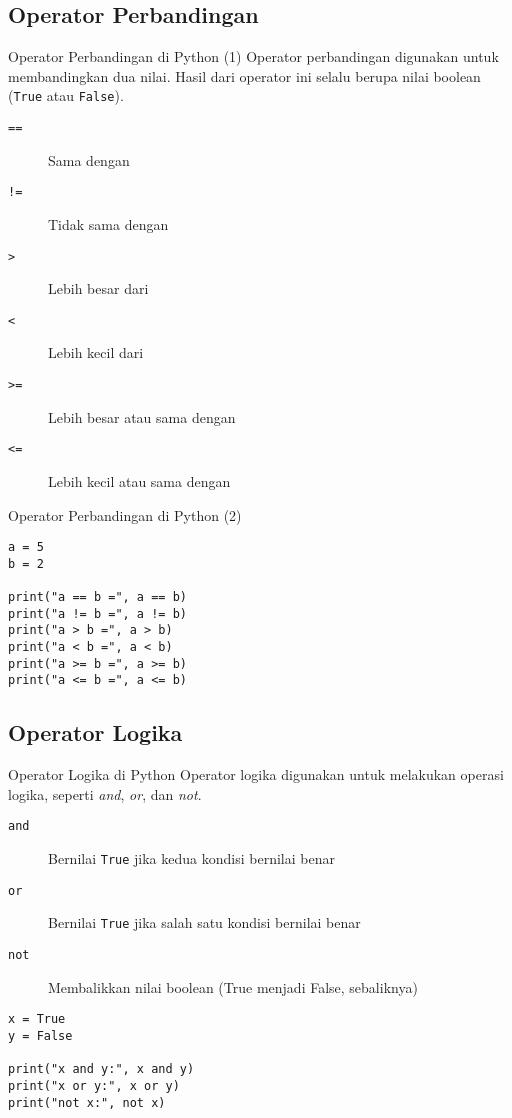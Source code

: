 \documentclass[aspectratio=169, table]{beamer}
\begin{document}
\subsection{Operator Perbandingan}

\begin{frame}[fragile]{Operator Perbandingan di Python (1)}
Operator perbandingan digunakan untuk membandingkan dua nilai. 
Hasil dari operator ini selalu berupa nilai boolean (\texttt{True} atau \texttt{False}).

\begin{description}
    \item[\texttt{==}] Sama dengan
    \item[\texttt{!=}] Tidak sama dengan
    \item[\texttt{>} ] Lebih besar dari
    \item[\texttt{<}] Lebih kecil dari
    \item[\texttt{>=}] Lebih besar atau sama dengan
    \item[\texttt{<=}] Lebih kecil atau sama dengan
\end{description}
\end{frame}

\begin{frame}[fragile]{Operator Perbandingan di Python (2)}
\begin{lstlisting}[style=PythonStyle, caption={Kode Python: comparison_operator.py}]
a = 5
b = 2

print("a == b =", a == b)
print("a != b =", a != b)
print("a > b =", a > b)
print("a < b =", a < b)
print("a >= b =", a >= b)
print("a <= b =", a <= b)
\end{lstlisting}
\end{frame}

\subsection{Operator Logika}

\begin{frame}[fragile]{Operator Logika di Python}
Operator logika digunakan untuk melakukan operasi logika, seperti \textit{and}, \textit{or}, dan \textit{not}.
\begin{description}
    \item[\texttt{and}] Bernilai \texttt{True} jika kedua kondisi bernilai benar
    \item[\texttt{or}] Bernilai \texttt{True} jika salah satu kondisi bernilai benar
    \item[\texttt{not}] Membalikkan nilai boolean (True menjadi False, sebaliknya)
\end{description}

\begin{lstlisting}[style=PythonStyle, caption={Kode Python: logical_operator.py}]
x = True
y = False

print("x and y:", x and y)
print("x or y:", x or y)
print("not x:", not x)
\end{lstlisting}
\end{frame}
\end{document}
